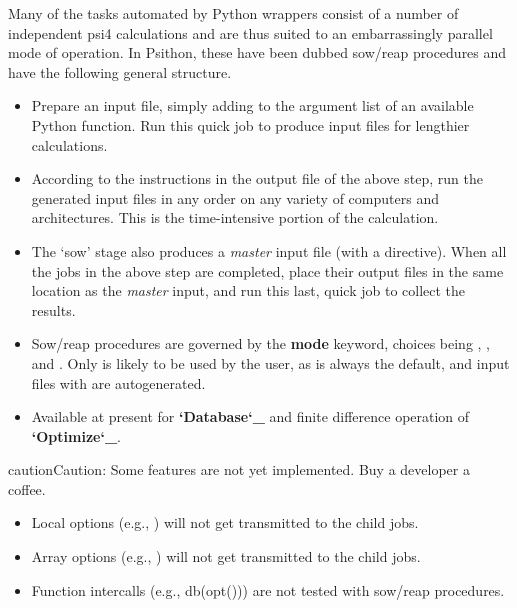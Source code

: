 \documentclass[letterpaper,10pt,english]{sphinxmanual}
\begin{document}
Many of the tasks automated by Python wrappers consist of a number of
independent psi4 calculations and are thus suited to an embarrassingly
parallel mode of operation. In Psithon, these have been dubbed sow/reap
procedures and have the following general structure.
\begin{itemize}
\item {} 
Prepare an input file, simply adding  to the
argument list of an available Python function. Run this quick job to
produce input files for lengthier calculations.

\item {} 
According to the instructions in the output file of the above step,
run the generated input files in any order on any variety of computers
and architectures. This is the time-intensive portion of the
calculation.

\item {} 
The `sow' stage also produces a \emph{master} input file (with a
 directive). When all the jobs in the above step are
completed, place their output files in the same location as the
\emph{master} input, and run this last, quick job to collect the results.

\end{itemize}
\begin{itemize}
\item {} 
Sow/reap procedures are governed by the \textbf{mode} keyword, choices being
, , and . Only  is likely to
be used by the user, as  is always the default, and
input files with  are autogenerated.

\item {} 
Available at present for {\color{red}\bfseries{}{}`Database{}`\_} and finite difference operation of {\color{red}\bfseries{}{}`Optimize{}`\_}.

\end{itemize}

\begin{notice}{caution}{Caution:}
Some features are not yet implemented. Buy a developer a coffee.
\begin{itemize}
\item {} 
Local options (e.g., ) will not get transmitted to the child jobs.

\item {} 
Array options (e.g., ) will not get transmitted to the child jobs.

\item {} 
Function intercalls (e.g., db(opt())) are not tested with sow/reap procedures.

\end{itemize}
\end{notice}
\end{document}
